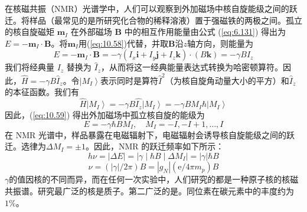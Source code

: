     在核磁共振（NMR）光谱学中，人们可以观察到外加磁场中核自旋能级之间的跃迁。将样品（最常见的是所研究化合物的稀释溶液）置于强磁铁的两极之间。孤立的核自旋磁矩 $\mathbf{m}_I$ 在外部磁场 $\mathbf{B}$ 中的相互作用能量由公式 (\ref{eq:6.131}) 得出为$E = -\mathbf{m}_I \cdot \mathbf{B}$。将$\mathbf{m}_I$用(\ref{eq:10.58})代替，并取$\mathbf{B}$沿$z$轴方向，则能量为
    \begin{equation*}
        E = -\mathbf{m}_{I} \cdot \mathbf{B} = -\gamma \left(I_{x}\mathbf{i} + I_{y}\mathbf{j} + I_{z}\mathbf{k}\right) \cdot \left(B\mathbf{k}\right) = -\gamma B I_{z}
    \end{equation*}
    我们将经典量 $I_z$ 替换为 $\hat{I}_z$，从而将这一经典能量表达式转换为哈密顿算符。因此，$\hat{H} = -\gamma B \hat{I}_z$。令$\left| M_I \right\rangle$表示同时是算符$\hat{I}^2$（为核自旋角动量大小的平方）和$\hat{I}_z$的本征函数。我们有
    \begin{equation}
        \hat{H} \left| M_I \right\rangle = - \gamma B \hat{I_z} \left| M_I \right\rangle = - \gamma B M_I \hbar \left| M_I \right\rangle
        \label{eq:10.59}
    \end{equation}
    因此，(\ref{eq:10.59}) 得出外加磁场中孤立核自旋的能级为
    \begin{equation*}
        E = -\gamma \hbar B M_I, \quad M_I = -I, -I+1, \ldots, I
    \end{equation*}
    在 NMR 光谱中，样品暴露在电磁辐射下，电磁辐射会诱导核自旋能级之间的跃迁。选律为$\Delta M_I = \pm 1$。因此，NMR 的跃迁频率如下所示：
    \begin{equation*}
        h\nu = \left|\Delta E\right| = \left|\gamma \middle| \hbar B \middle| \Delta M_I\right| = \left|\gamma \right| \hbar B
    \end{equation*}
    \begin{equation}
        \nu = \left(\left|\gamma\right|/2\pi\right)B = \left|g_N\right| \left(\mathrm{e}/4\pi m_p\right)B
        \label{eq:10.60}
    \end{equation}
    $\gamma$的值因核的不同而异，而在任何一次实验中，人们研究的都是一种原子核的核磁共振谱。研究最广泛的核是质子。第二广泛的是。同位素在碳元素中的丰度约为$1\%$。

